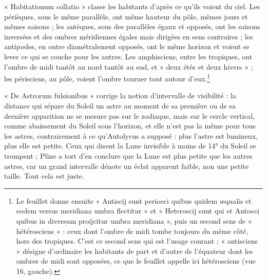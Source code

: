 \documentclass[11pt,a4paper]{article}
\begin{document}
« Habitationum collatio » classe les habitants d'après ce qu'ils voient du ciel.
Les périèques, sous le même parallèle, ont même hauteur du pôle, mêmes jours et
mêmes saisons ; les antèques, sous des parallèles égaux et opposés, ont les
saisons inversées et des ombres méridiennes égales mais dirigées en sens
contraires ; les antipodes, en outre diamétralement opposés, ont le même horizon
et voient se lever ce qui se couche pour les autres. Les amphisciens, entre les
tropiques, ont l'ombre de midi tantôt au nord tantôt au sud, et « deux étés et
deux hivers » ; les périsciens, au pôle, voient l'ombre tourner tout autour
d'eux.\footnote{Le feuillet donne ensuite « Antiscij sunt perioeci quibus quidem
æqualis et eodem versus meridiana umbra flectitur » et « Heteroscij sunt qui et
Antoeci quibus in diversum proijcitur umbra meridiana », puis un second sens de
« hétérosciens » : ceux dont l'ombre de midi tombe toujours du même côté, hors des
tropiques. C'est ce second sens qui est l'usage courant ; « antisciens » désigne
d'ordinaire les habitants de part et d'autre de l'équateur dont les ombres de
midi sont opposées, ce que le feuillet appelle ici hétérosciens (vue 16,
gauche).}

« De Astrorum fulsionibus » corrige la notion d'intervalle de visibilité : la
distance qui sépare du Soleil un astre au moment de sa première ou de sa
dernière apparition ne se mesure pas sur le zodiaque, mais sur le cercle vertical,
comme abaissement du Soleil sous l'horizon, et elle n'est pas la même pour tous
les astres, contrairement à ce qu'Autolycus a supposé : plus l'astre est
lumineux, plus elle est petite. Ceux qui disent la Lune invisible à moins de
14° du Soleil se trompent ; Pline a tort d'en conclure que la Lune est plus
petite que les autres astres, car un grand intervalle dénote un éclat apparent
faible, non une petite taille. Tout cela est juste.
\end{document}
